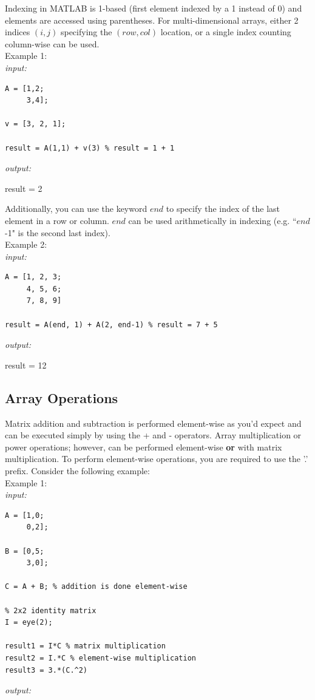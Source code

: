 \documentclass[../MATLAB_Primer.tex]{subfiles}
\begin{document}
Indexing in MATLAB is 1-based (first element indexed by a 1 instead of 0) and elements are accessed using parentheses.  For multi-dimensional arrays, either 2 indices $(i,j)$ specifying the $(row,col)$ location, or a single index counting column-wise can be used.\\

Example 1:\\

\textit{input:}
\begin{lstlisting}
A = [1,2;
     3,4];

v = [3, 2, 1];

result = A(1,1) + v(3) % result = 1 + 1
\end{lstlisting}

\textit{output:}
\begin{center}
    result = 2
\end{center}

Additionally, you can use the keyword $end$ to specify the index of the last element in a row or column.  $end$ can be used arithmetically in indexing (e.g. ``$end$-1" is the second last index).\\

Example 2:\\

\textit{input:}
\begin{lstlisting}
A = [1, 2, 3;
     4, 5, 6;
     7, 8, 9]
     
result = A(end, 1) + A(2, end-1) % result = 7 + 5
\end{lstlisting}

\textit{output:}
\begin{center}
    result = 12
\end{center}

\subsection{Array Operations} \label{Basic}
Matrix addition and subtraction is performed element-wise as you'd expect and can be executed simply by using the + and - operators. Array  multiplication or power operations; however, can be performed element-wise \textbf{or} with matrix multiplication. To perform element-wise operations, you are required to use the '.' prefix. Consider the following example:\\

Example 1:\\

\textit{input:}
\begin{lstlisting}
A = [1,0; 
     0,2];
     
B = [0,5; 
     3,0];

C = A + B; % addition is done element-wise

% 2x2 identity matrix
I = eye(2);

result1 = I*C % matrix multiplication
result2 = I.*C % element-wise multiplication
result3 = 3.*(C.^2)
\end{lstlisting}
\textit{output:}
\end{document}
